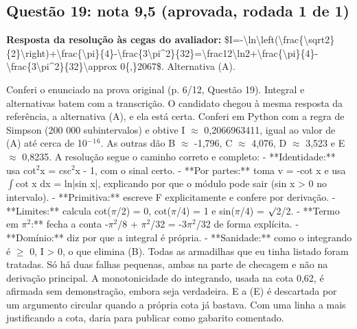 \documentclass{article}%
\begin{document}
\subsection*{Questão 19: nota 9,5 (aprovada, rodada 1 de 1)}%
\textbf{Resposta da resolução às cegas do avaliador:} \$I={-}\textbackslash{}ln\textbackslash{}left(\textbackslash{}frac\{\textbackslash{}sqrt2\}\{2\}\textbackslash{}right)+\textbackslash{}frac\{\textbackslash{}pi\}\{4\}{-}\textbackslash{}frac\{3\textbackslash{}pi\^{}2\}\{32\}=\textbackslash{}frac12\textbackslash{}ln2+\textbackslash{}frac\{\textbackslash{}pi\}\{4\}{-}\textbackslash{}frac\{3\textbackslash{}pi\^{}2\}\{32\}\textbackslash{}approx 0\{,\}2067\$. Alternativa (A).\par %
Conferi o enunciado na prova original (p. 6/12, Questão 19). Integral e alternativas batem com a transcrição. O candidato chegou à mesma resposta da referência, a alternativa (A), e ela está certa. Conferi em Python com a regra de Simpson (200 000 subintervalos) e obtive I $\approx$ 0,2066963411, igual ao valor de (A) até cerca de 10$^{-}$$^{1}$$^{6}$. As outras dão B $\approx$ -1,796, C $\approx$ 4,076, D $\approx$ 3,523 e E $\approx$ 0,8235.\newline%
\newline%
A resolução segue o caminho correto e completo:\newline%
{-} **Identidade:** usa cot$^2$x = csc$^2$x - 1, com o sinal certo.\newline%
{-} **Por partes:** toma v = -cot x e usa $\int$cot x dx = ln|sin x|, explicando por que o módulo pode sair (sin x > 0 no intervalo).\newline%
{-} **Primitiva:** escreve F explicitamente e confere por derivação.\newline%
{-} **Limites:** calcula cot($\pi$/2) = 0, cot($\pi$/4) = 1 e sin($\pi$/4) = $\surd$2/2.\newline%
{-} **Termo em $\pi$$^2$:** fecha a conta -$\pi$$^2$/8 + $\pi$$^2$/32 = -3$\pi$$^2$/32 de forma explícita.\newline%
{-} **Domínio:** diz por que a integral é própria.\newline%
{-} **Sanidade:** como o integrando é $\geq$ 0, I > 0, o que elimina (B).\newline%
\newline%
Todas as armadilhas que eu tinha listado foram tratadas. Só há duas falhas pequenas, ambas na parte de checagem e não na derivação principal. A monotonicidade do integrando, usada na cota 0,62, é afirmada sem demonstração, embora seja verdadeira. E a (E) é descartada por um argumento circular quando a própria cota já bastava. Com uma linha a mais justificando a cota, daria para publicar como gabarito comentado.%
\end{document}
